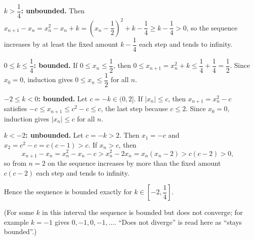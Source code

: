 \textbf{$k>\dfrac{1}{4}$: unbounded.} Then $x_{n+1}-x_n=x_n^2-x_n+k=\left(x_n-\dfrac{1}{2}\right)^2+k-\dfrac{1}{4}\ge k-\dfrac{1}{4}>0$, so the sequence increases by at least the fixed amount $k-\dfrac{1}{4}$ each step and tends to infinity.

\textbf{$0\le k\le\dfrac{1}{4}$: bounded.} If $0\le x_n\le\dfrac{1}{2}$, then $0\le x_{n+1}=x_n^2+k\le\dfrac{1}{4}+\dfrac{1}{4}=\dfrac{1}{2}$. Since $x_0=0$, induction gives $0\le x_n\le\dfrac{1}{2}$ for all $n$.

\textbf{$-2\le k<0$: bounded.} Let $c=-k\in(0,2]$. If $|x_n|\le c$, then $x_{n+1}=x_n^2-c$ satisfies $-c\le x_{n+1}\le c^2-c\le c$, the last step because $c\le2$. Since $x_0=0$, induction gives $|x_n|\le c$ for all $n$.

\textbf{$k<-2$: unbounded.} Let $c=-k>2$. Then $x_1=-c$ and $x_2=c^2-c=c(c-1)>c$. If $x_n>c$, then
\[
x_{n+1}-x_n=x_n^2-x_n-c>x_n^2-2x_n=x_n(x_n-2)>c(c-2)>0 ,
\]
so from $n=2$ on the sequence increases by more than the fixed amount $c(c-2)$ each step and tends to infinity.

Hence the sequence is bounded exactly for $\boxed{k\in\left[-2,\dfrac{1}{4}\right]}$.

(For some $k$ in this interval the sequence is bounded but does not converge; for example $k=-1$ gives $0,-1,0,-1,\dots$. ``Does not diverge'' is read here as ``stays bounded''.)
